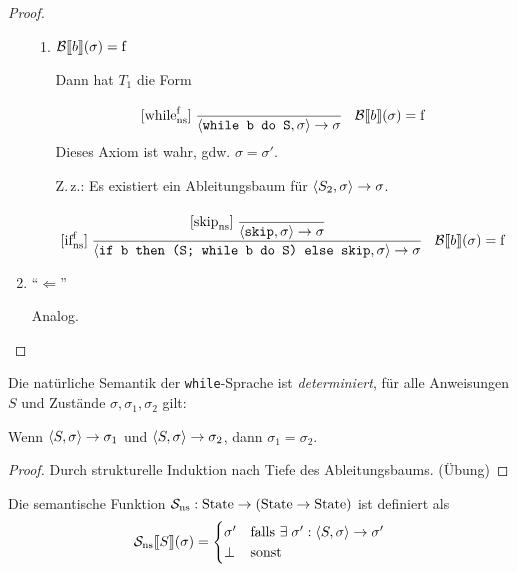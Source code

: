 \begin{proof}
\begin{enumerate}
\begin{enumerate}
                \item $\Bsem{b}(\sigma) = \false$

                    Dann hat $T_1$ die Form
                    \begin{align*}
                        \infruleNs[\false]{while}\;
                        \cfrac{}{
                            \strans{\texttt{while b do S}}{\sigma}{\sigma}
                        }
                        \quad
                        \Bsem{b}(\sigma) = \false
                    \end{align*}
                    Dieses Axiom ist wahr, gdw. $\sigma = \sigma'$.

                    Z.\,z.: Es existiert ein Ableitungsbaum für $\strans{S_2}{\sigma}{\sigma}$.
                    \begin{align*}
                        \infruleNs[\false]{if}\;
                        \cfrac{
                            \infruleNs{skip}\;
                            \cfrac{}{\strans{\texttt{skip}}{\sigma}{\sigma}}
                        }{
                            \strans{\texttt{if b then (S; while b do S) else skip}}{\sigma}{\sigma}
                        }
                        \quad
                        \Bsem{b}(\sigma) = \false
                    \end{align*}
            \end{enumerate}

        \item ``$\Leftarrow$''

            Analog.
    \end{enumerate}
\end{proof}

\begin{lemma}
    Die natürliche Semantik der \texttt{while}-Sprache ist \emph{determiniert}, \dh{} für alle Anweisungen $S$ und Zustände $\sigma, \sigma_1, \sigma_2$ gilt:

    Wenn $\strans{S}{\sigma}{\sigma_1}$ und $\strans{S}{\sigma}{\sigma_2}$, dann $\sigma_1 = \sigma_2$.
\end{lemma}
\begin{proof}
    Durch strukturelle Induktion nach Tiefe des Ableitungsbaums. (Übung)
\end{proof}


\begin{definition}
    Die semantische Funktion $\mathcal{S}_{\text{ns}}: \State \to (\State \to \State)$ ist definiert als
    \begin{align*}
        \mathcal{S}_{\text{ns}}\lsem S \rsem(\sigma) = \begin{cases}
            \sigma' & \text{falls } \exists\; \sigma': \strans{S}{\sigma}{\sigma'} \\
            \bot & \text{sonst}
        \end{cases}
    \end{align*}
\end{definition}